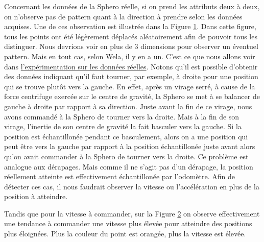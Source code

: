 \begin{figure}
 \centering
 \label{we:targetxy}
\end{figure}
Concernant les données de la Sphero réelle, si on prend les attributs deux à deux, on n'observe pas de pattern quant à la direction à prendre selon les données acquises.
Une de ces observation est illustrée dans la Figure \ref{we:targetxy}.
Dans cette figure, tous les points ont été légèrement déplacés aléatoirement afin de pouvoir tous les distinguer.
Nous devrions voir en plus de 3 dimensions pour observer un éventuel pattern.
Mais en tout cas, selon Wela, il y en a un.
C'est ce que nous allons voir dans \hyperref[sec:realdataex]{l'expérimentation sur les données réelles}.
Notons qu'il est possible d'obtenir des données indiquant qu'il faut tourner, par exemple, à droite pour une position qui se trouve plutôt vers la gauche.
En effet, après un virage serré, à cause de la force centrifuge exercée sur le centre de gravité, la Sphero se met à se balancer de gauche à droite par rapport à sa direction.
Juste avant la fin de ce virage, nous avons commandé à la Sphero de tourner vers la droite.
Mais à la fin de son virage, l'inertie de son centre de gravité la fait basculer vers la gauche.
Si la position est échantillonée pendant ce basculement, alors on a une position qui peut être vers la gauche par rapport à la position échantillonée juste avant alors qu'on avait commander à la Sphero de tourner vers la droite.
Ce problème est analogue aux dérapages.
Mais comme il ne s'agit pas d'un dérapage, la position réellement atteinte est effectivement échantillonée par l'odomètre.
Afin de détecter ces cas, il nous faudrait observer la vitesse ou l'accélération en plus de la position à atteindre.

\begin{figure}
 \centering
 \label{we:targetxySpeed}
\end{figure}
Tandis que pour la vitesse à commander, sur la Figure \ref{we:targetxySpeed} on observe effectivement une tendance à commander une vitesse plus élevée pour atteindre des positions plus éloignées.
Plus la couleur du point est orangée, plus la vitesse est élevée.

